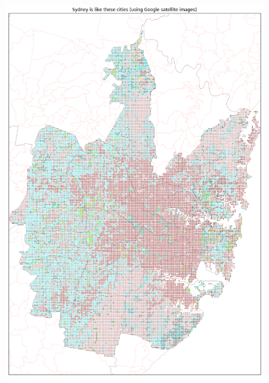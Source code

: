 \documentclass[sageh,times]{sagej}
\begin{document}
\begin{figure}[!htbp]
\centering    
\includegraphics[scale=0.20]{Images/SydneyOverall_sat.png} 

\end{figure}
\end{document}
